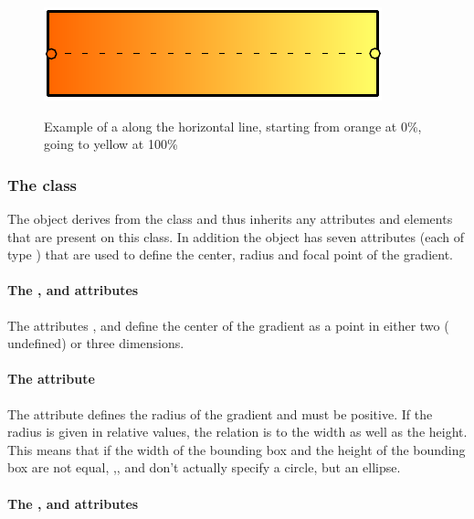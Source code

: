 \begin{figure}[!ht]
  \centering
  \includegraphics{figures/lingrad01.pdf}\\
  \caption{Example of a \LinearGradient along the horizontal line, starting from orange at 0\%, 
	 going to yellow at 100\%}
  \label{fig:lingrad}
\end{figure}


\subsubsection{The  class}
\label{radialgradient-class}


The \RadialGradient object derives from the \GradientBase class and thus
inherits any attributes and elements that are present on this class.
In addition the \RadialGradient object has seven attributes (each of type \RelAbsVector) that are used to define the center, radius and focal point of the gradient.



\paragraph{The \fixttspace{}, \fixttspace{} and \fixttspace{} attributes}

The attributes ,  and  define the center of the gradient as a point in either two ( undefined) or three dimensions.


\paragraph{The \fixttspace{} attribute}

The attribute  defines the radius of the gradient and must be positive. If the radius is given in relative values, the relation is to the width as well as the height. This means that 
if the width of the bounding box and the height of the bounding box are not equal, ,,
and  don't actually specify a circle, but an ellipse.

\paragraph{The \fixttspace{}, \fixttspace{} and \fixttspace{} attributes}

